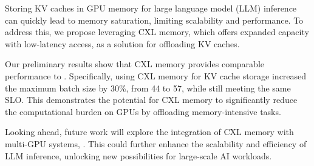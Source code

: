 Storing KV caches in GPU memory for large language model (LLM) inference can quickly lead to memory saturation, limiting scalability and performance. To address this, we propose leveraging CXL memory, which offers expanded capacity with low-latency access, as a solution for offloading KV caches.

Our preliminary results show that CXL memory provides comparable performance to . Specifically, using CXL memory for KV cache storage increased the maximum batch size by 30\%, from 44 to 57, while still meeting the same SLO. This demonstrates the potential for CXL memory to significantly reduce the computational burden on GPUs by offloading memory-intensive tasks.

Looking ahead, future work will explore the integration of CXL memory with multi-GPU systems, . This could further enhance the scalability and efficiency of LLM inference, unlocking new possibilities for large-scale AI workloads.

